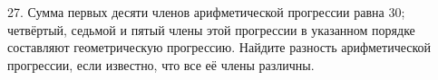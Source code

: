 27. Сумма первых десяти членов арифметической прогрессии равна 30; четвёртый, седьмой и пятый члены этой прогрессии в указанном порядке составляют геометрическую прогрессию. Найдите разность арифметической прогрессии, если известно, что все её члены различны.\\
